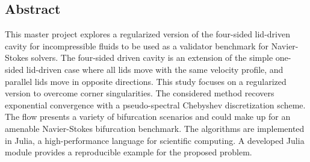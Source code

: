 
\begin{center}
\section*{Abstract}
\end{center} 

This master project explores a regularized version of the four-sided lid-driven
cavity for incompressible fluids to be used as a validator benchmark for
Navier-Stokes solvers. The four-sided driven cavity is an extension of the
simple one-sided lid-driven case where all lids move with the same velocity
profile, and parallel lids move in opposite directions. This study focuses on a
regularized version to overcome corner singularities. The considered method
recovers exponential convergence with a pseudo-spectral Chebyshev
discretization scheme. The flow presents a variety of bifurcation scenarios and
could make up for an amenable Navier-Stokes bifurcation benchmark. The
algorithms are implemented in Julia, a high-performance language for scientific
computing. A developed Julia module provides a reproducible example for the
proposed problem.

